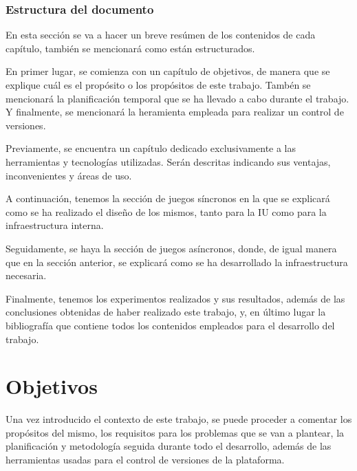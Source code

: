 \documentclass[a4paper, 12pt]{book}
\begin{document}
\subsection{Estructura del documento}

En esta sección se va a hacer un breve resúmen de los contenidos de cada capítulo, también se mencionará como están estructurados.

En primer lugar, se comienza con un capítulo de objetivos, de manera que se explique cuál es el propósito o los propósitos de este trabajo. Tambén se mencionará la planificación temporal que se ha llevado a cabo durante el trabajo. Y finalmente, se mencionará la heramienta empleada para realizar un control de versiones.

Previamente, se encuentra un capítulo dedicado exclusivamente a las herramientas y tecnologías utilizadas. Serán descritas indicando sus ventajas, inconvenientes y áreas de uso.

A continuación, tenemos la sección de juegos síncronos en la que se explicará como se ha realizado el diseño de los mismos, tanto para la IU como para la infraestructura interna.

Seguidamente, se haya la sección de juegos asíncronos, donde, de igual manera que en la sección anterior, se explicará como se ha desarrollado la infraestructura necesaria.

Finalmente, tenemos los experimentos realizados y sus resultados, además de las conclusiones obtenidas de haber realizado este trabajo, y, en último lugar la bibliografía que contiene todos los contenidos empleados para el desarrollo del trabajo.


\cleardoublepage %
\chapter{Objetivos} %
\label{chap:objetivos} %

Una vez introducido el contexto de este trabajo, se puede proceder a comentar los propósitos del mismo, los requisitos para los problemas que se van a plantear, la planificación y metodología seguida durante todo el desarrollo, además de las herramientas usadas para el control de versiones de la plataforma.
\end{document}
